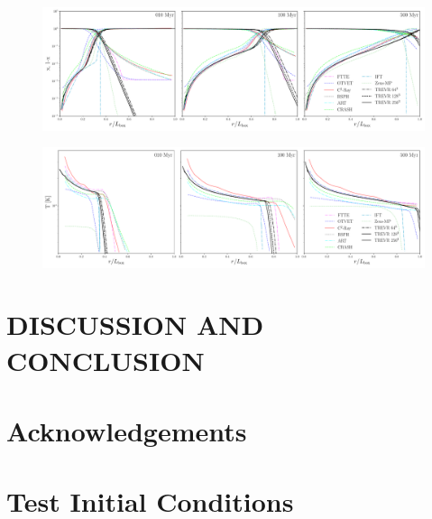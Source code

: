 \documentclass[fleq,usenatbib]{mnras}
\begin{document}
\begin{figure}
\includegraphics[width=1\linewidth]{Figures/strom_fraction.pdf}
\caption{}
\label{fig:stromtherm}
\end{figure}
\begin{figure}
\includegraphics[width=1\linewidth]{Figures/strom_temp.pdf}
\caption{}
\label{fig:stromtemp}
\end{figure}
\section{DISCUSSION AND CONCLUSION}\label{sec:disc}

\section*{Acknowledgements}\label{sec:ackn}








\appendix
\section{Test Initial Conditions}\label{sec:icnd}
\end{document}
